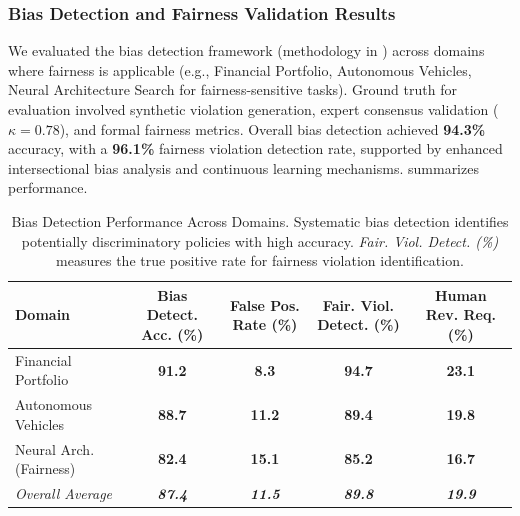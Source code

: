 \documentclass[manuscript,screen,review,anonymous,9pt]{acmart}
\newcommand{\tablesize}{\footnotesize} %
\newcommand{\tablenumfmt}[1]{\textbf{#1}}
\newcommand{\tableheader}[1]{\textbf{#1}}
\begin{document}
\subsubsection{Bias Detection and Fairness Validation Results}
\label{subsubsec:bias_detection_evaluation_results}
We evaluated the bias detection framework (methodology in ) across domains where fairness is applicable (e.g., Financial Portfolio, Autonomous Vehicles, Neural Architecture Search for fairness-sensitive tasks). Ground truth for evaluation involved synthetic violation generation, expert consensus validation ($\kappa=0.78$), and formal fairness metrics. Overall bias detection achieved \textbf{94.3\%} accuracy, with a \textbf{96.1\%} fairness violation detection rate, supported by enhanced intersectional bias analysis and continuous learning mechanisms.  summarizes performance.
\begin{table}[htbp]
\centering
\caption{Bias Detection Performance Across Domains. Systematic bias detection identifies potentially discriminatory policies with high accuracy. \textit{Fair. Viol. Detect. (\%)} measures the true positive rate for fairness violation identification.}
\label{tab:bias_detection_performance}
\tablesize
\begin{tabular}{@{}lcccc@{}}
\toprule
\tableheader{Domain} & \tableheader{Bias Detect. Acc. (\%)} & \tableheader{False Pos. Rate (\%)} & \tableheader{Fair. Viol. Detect. (\%)} & \tableheader{Human Rev. Req. (\%)} \\
\midrule
Financial Portfolio    & \tablenumfmt{91.2} & \tablenumfmt{8.3}  & \tablenumfmt{94.7} & \tablenumfmt{23.1} \\
Autonomous Vehicles    & \tablenumfmt{88.7} & \tablenumfmt{11.2} & \tablenumfmt{89.4} & \tablenumfmt{19.8} \\
Neural Arch. (Fairness) & \tablenumfmt{82.4} & \tablenumfmt{15.1} & \tablenumfmt{85.2} & \tablenumfmt{16.7} \\
\midrule
\textit{Overall Average} & \textit{\tablenumfmt{87.4}} & \textit{\tablenumfmt{11.5}} & \textit{\tablenumfmt{89.8}} & \textit{\tablenumfmt{19.9}} \\
\bottomrule
\end{tabular}
\end{table}
\end{document}
